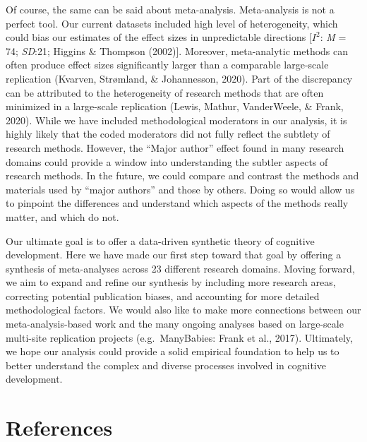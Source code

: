 \documentclass[10pt, letterpaper]{article}
\begin{document}
Of course, the same can be said about meta-analysis. Meta-analysis is
not a perfect tool. Our current datasets included high level of
heterogeneity, which could bias our estimates of the effect sizes in
unpredictable directions {[}\(I^2\): \emph{M} = 74; \emph{SD}:21;
Higgins \& Thompson (2002){]}. Moreover, meta-analytic methods can often
produce effect sizes significantly larger than a comparable large-scale
replication (Kvarven, Strømland, \& Johannesson, 2020). Part of the
discrepancy can be attributed to the heterogeneity of research methods
that are often minimized in a large-scale replication (Lewis, Mathur,
VanderWeele, \& Frank, 2020). While we have included methodological
moderators in our analysis, it is highly likely that the coded
moderators did not fully reflect the subtlety of research methods.
However, the ``Major author'' effect found in many research domains
could provide a window into understanding the subtler aspects of
research methods. In the future, we could compare and contrast the
methods and materials used by ``major authors'' and those by others.
Doing so would allow us to pinpoint the differences and understand which
aspects of the methods really matter, and which do not.

Our ultimate goal is to offer a data-driven synthetic theory of
cognitive development. Here we have made our first step toward that goal
by offering a synthesis of meta-analyses across 23 different research
domains. Moving forward, we aim to expand and refine our synthesis by
including more research areas, correcting potential publication biases,
and accounting for more detailed methodological factors. We would also
like to make more connections between our meta-analysis-based work and
the many ongoing analyses based on large-scale multi-site replication
projects (e.g.~ManyBabies: Frank et al., 2017). Ultimately, we hope our
analysis could provide a solid empirical foundation to help us to better
understand the complex and diverse processes involved in cognitive
development.

\hypertarget{references}{%
\section{References}\label{references}}

\setlength{\parindent}{-0.1in} 
\setlength{\leftskip}{0.125in}

\noindent
\end{document}
